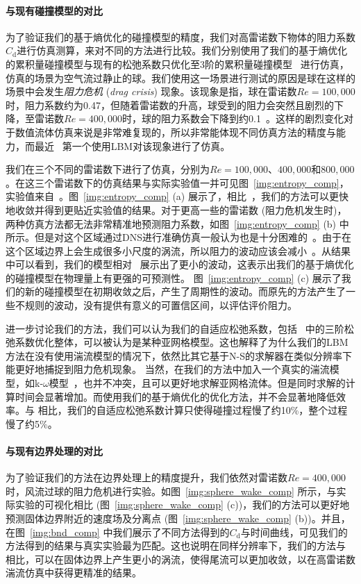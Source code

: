 \paragraph{与现有碰撞模型的对比}
为了验证我们的基于熵优化的碰撞模型的精度，我们对高雷诺数下物体的阻力系数$C_\text{d}$进行仿真测算，来对不同的方法进行比较。我们分别使用了我们的基于熵优化的累积量碰撞模型与现有的松弛系数只优化至3阶的累积量碰撞模型~\cite{Geier-2017} 进行仿真，仿真的场景为空气流过静止的球。我们使用这一场景进行测试的原因是球在这样的场景中会发生\emph{阻力危机} (\emph{drag crisis}) 现象。该现象是指，球在雷诺数$Re=100,000$时，阻力系数约为0.47，但随着雷诺数的升高，球受到的阻力会突然且剧烈的下降，至雷诺数$Re=400,000$时，球的阻力系数会下降到约0.1~\cite{Tiwari-2020}。这样的剧烈变化对于数值流体仿真来说是非常难复现的，所以非常能体现不同仿真方法的精度与能力，而最近~\cite{Geier-2017-b} 第一个使用LBM对该现象进行了仿真。

我们在三个不同的雷诺数下进行了仿真，分别为$Re=100,000$、$400,000$和$800,000$。在这三个雷诺数下的仿真结果与实际实验值一并可见图~\ref{img:entropy_comp}，实验值来自~\cite{Barati-2014}。图~\ref{img:entropy_comp} (a) 展示了，相比~\cite{Geier-2017}，我们的方法可以更快地收敛并得到更贴近实验值的结果。对于更高一些的雷诺数 (阻力危机发生时)，两种仿真方法都无法非常精准地预测阻力系数，如图~\ref{img:entropy_comp} (b) 中所示。但是对这个区域通过DNS进行准确仿真一般认为也是十分困难的~\cite{Tiwari-2020}。由于在这个区域边界上会生成很多小尺度的涡流，所以阻力的波动应该会减小~\cite{Deshpande-2017}。从结果中可以看到，我们的模型相对~\cite{Geier-2017} 展示出了更小的波动，这表示出我们的基于熵优化的碰撞模型在物理量上有更强的可预测性。
图~\ref{img:entropy_comp} (c) 展示了我们的新的碰撞模型在初期收敛之后，产生了周期性的波动。而原先的方法产生了一些不规则的波动，没有提供有意义的可置信区间，以评估评价阻力。

进一步讨论我们的方法，我们可以认为我们的自适应松弛系数，包括~\cite{Geier-2017} 中的三阶松弛系数优化整体，可以被认为是某种亚网格模型。这也解释了为什么我们的LBM方法在没有使用湍流模型的情况下，依然比其它基于N-S的求解器在类似分辨率下能更好地捕捉到阻力危机现象。
当然，在我们的方法中加入一个真实的湍流模型，如k-$\omega$模型~\cite{Menter-1994}，也并不冲突，且可以更好地求解亚网格流体。但是同时求解的计算时间会显著增加。而使用我们的基于熵优化的优化方法，并不会显著地降低效率。与 \cite{Geier-2017} 相比，我们的自适应松弛系数计算只使得碰撞过程慢了约10\%，整个过程慢了约5\%。

\paragraph{与现有边界处理的对比}
为了验证我们的方法在边界处理上的精度提升，我们依然对雷诺数$Re=400,000$时，风流过球的阻力危机进行实验。如图~\ref{img:sphere_wake_comp} 所示，与实际实验的可视化相比 (图~\ref{img:sphere_wake_comp} (c))，我们的方法可以更好地预测固体边界附近的速度场及分离点 (图~\ref{img:sphere_wake_comp} (b))。并且，在图~\ref{img:bnd_comp} 中我们展示了不同方法得到的$C_\text{d}$与时间曲线，可见我们的方法得到的结果与真实实验最为匹配。这也说明在同样分辨率下，我们的方法与~\cite{Tao-2018-b} 相比，可以在固体边界上产生更小的涡流，使得尾流可以更加收敛，以在高雷诺数湍流仿真中获得更精准的结果。

